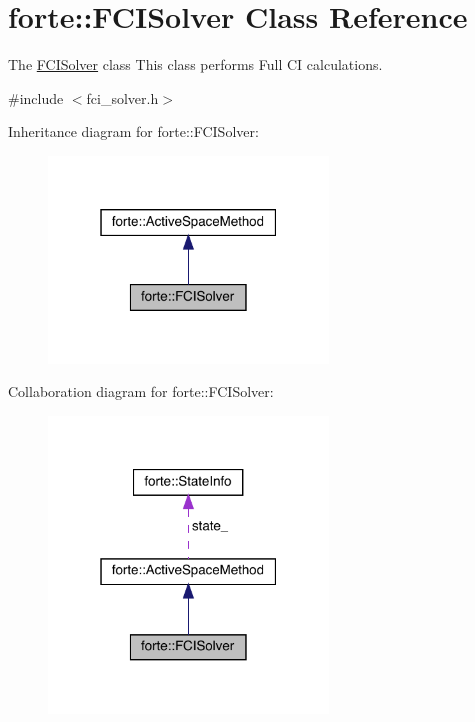 \hypertarget{classforte_1_1_f_c_i_solver}{}\section{forte\+:\+:F\+C\+I\+Solver Class Reference}
\label{classforte_1_1_f_c_i_solver}


The \mbox{\hyperlink{classforte_1_1_f_c_i_solver}{F\+C\+I\+Solver}} class This class performs Full CI calculations.  




{\ttfamily \#include $<$fci\+\_\+solver.\+h$>$}



Inheritance diagram for forte\+:\+:F\+C\+I\+Solver\+:
\nopagebreak
\begin{figure}[H]
\begin{center}
\leavevmode
\includegraphics[width=211pt]{classforte_1_1_f_c_i_solver__inherit__graph}
\end{center}
\end{figure}


Collaboration diagram for forte\+:\+:F\+C\+I\+Solver\+:
\nopagebreak
\begin{figure}[H]
\begin{center}
\leavevmode
\includegraphics[width=211pt]{classforte_1_1_f_c_i_solver__coll__graph}
\end{center}
\end{figure}
